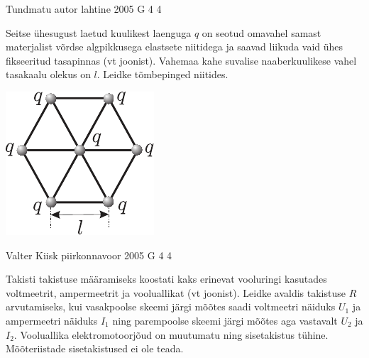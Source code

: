 \documentclass[11pt, twoside]{article}
\begin{document}
{%
{Tundmatu autor} %
{lahtine} %
{2005} %
{G 4} %
{4} %
{
\ifStatement
Seitse ühesugust laetud kuulikest laenguga $q$ on seotud omavahel samast materjalist võrdse algpikkusega elastsete niitidega ja saavad liikuda vaid ühes fikseeritud tasapinnas (vt joonist). Vahemaa kahe suvalise naaberkuulikese vahel tasakaalu olekus on $l$. Leidke tõmbepinged niitides.

\begin{center}
	\includegraphics[width=0.35\linewidth]{2005-lahg-04-yl}
\end{center}
\fi
}

{Valter Kiisk} %
{piirkonnavoor} %
{2005} %
{G 4} %
{4} %
{
\ifStatement
Takisti takistuse määramiseks koostati kaks erinevat vooluringi kasutades voltmeetrit, ampermeetrit ja vooluallikat (vt joonist). Leidke avaldis takistuse $R$ arvutamiseks, kui vasakpoolse skeemi järgi mõõtes saadi voltmeetri näiduks $U_1$ ja ampermeetri näiduks $I_1$ ning parempoolse skeemi järgi mõõtes aga vastavalt $U_2$ ja $I_2$. Vooluallika elektromotoorjõud on muutumatu ning sisetakistus tühine. Mõõteriistade sisetakistused ei ole teada.

\begin{figure}[h]
	\centering
	\hfill
\end{figure}

}}
\end{document}
